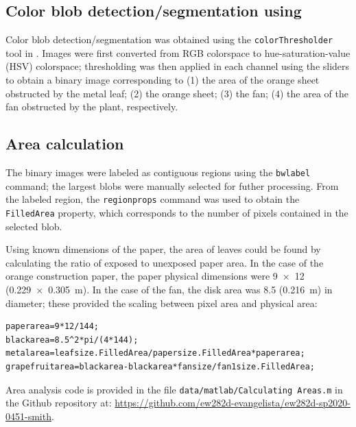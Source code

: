 \subsection{Color blob detection/segmentation using \Matlab}
Color blob detection/segmentation was obtained using the \lstinline{colorThresholder} tool in \Matlab. Images were first converted from RGB colorspace to hue-saturation-value (HSV) colorspace; thresholding was then applied in each channel using the sliders to obtain a binary image corresponding to (1) the area of the orange sheet obstructed by the metal leaf; (2) the orange sheet; (3) the fan; (4) the area of the fan obstructed by the plant, respectively. 

\subsection{Area calculation}
The binary images were labeled as contiguous regions using the \lstinline{bwlabel} command; the largest blobs were manually selected for futher processing. From the labeled region, the \lstinline{regionprops} command was used to obtain the \lstinline{FilledArea} property, which corresponds to the number of pixels contained in the selected blob. 

Using known dimensions of the paper, the area of leaves could be found by calculating the ratio of exposed to unexposed paper area. In the case of the orange construction paper, the paper physical dimensions were \SI{9x12}{\inch} (\SI{0.229x0.305}{\meter}). In the case of the fan, the disk area was \SI{8.5}{\inch} (\SI{0.216}{\meter}) in diameter; these provided the scaling between pixel area and physical area:
\begin{lstlisting}
paperarea=9*12/144;
blackarea=8.5^2*pi/(4*144);
metalarea=leafsize.FilledArea/papersize.FilledArea*paperarea;
grapefruitarea=blackarea-blackarea*fansize/fan1size.FilledArea;
\end{lstlisting}

Area analysis code is provided in the file \lstinline{data/matlab/Calculating Areas.m} in the Github repository at: \url{https://github.com/ew282d-evangelista/ew282d-sp2020-0451-smith}.



